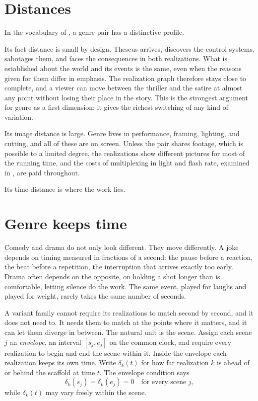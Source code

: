\section{Distances}

In the vocabulary of , a genre pair has a distinctive profile.

Its fact distance is small by design. Theseus arrives, discovers the control systems, sabotages them, and faces the consequences in both realizations. What is established about the world and its events is the same, even when the reasons given for them differ in emphasis. The realization graph therefore stays close to complete, and a viewer can move between the thriller and the satire at almost any point without losing their place in the story. This is the strongest argument for genre as a first dimension: it gives the richest switching of any kind of variation.

Its image distance is large. Genre lives in performance, framing, lighting, and cutting, and all of these are on screen. Unless the pair shares footage, which is possible to a limited degree, the realizations show different pictures for most of the running time, and the costs of multiplexing in light and flash rate, examined in , are paid throughout.

Its time distance is where the work lies.

\section{Genre keeps time}

Comedy and drama do not only look different. They move differently. A joke depends on timing measured in fractions of a second: the pause before a reaction, the beat before a repetition, the interruption that arrives exactly too early. Drama often depends on the opposite, on holding a shot longer than is comfortable, letting silence do the work. The same event, played for laughs and played for weight, rarely takes the same number of seconds.

A variant family cannot require its realizations to match second by second, and it does not need to. It needs them to match at the points where it matters, and it can let them diverge in between. The natural unit is the scene. Assign each scene $j$ an \emph{envelope}, an interval $[s_j,e_j]$ on the common clock, and require every realization to begin and end the scene within it. Inside the envelope each realization keeps its own time. Write $\delta_k(t)$ for how far realization $k$ is ahead of or behind the scaffold at time $t$. The envelope condition says
\begin{equation}
\delta_k(s_j)=\delta_k(e_j)=0\quad\text{for every scene } j,
\end{equation}
while $\delta_k(t)$ may vary freely within the scene.

